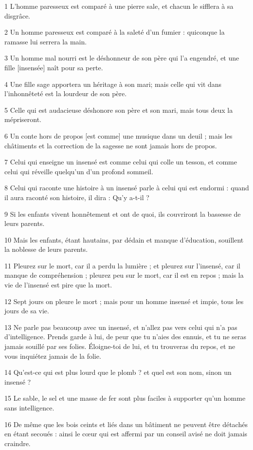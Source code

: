 \par 1 L'homme paresseux est comparé à une pierre sale, et chacun le sifflera à sa disgrâce.
\par 2 Un homme paresseux est comparé à la saleté d'un fumier : quiconque la ramasse lui serrera la main.
\par 3 Un homme mal nourri est le déshonneur de son père qui l'a engendré, et une fille [insensée] naît pour sa perte.
\par 4 Une fille sage apportera un héritage à son mari; mais celle qui vit dans l'inhonnêteté est la lourdeur de son père.
\par 5 Celle qui est audacieuse déshonore son père et son mari, mais tous deux la mépriseront.
\par 6 Un conte hors de propos [est comme] une musique dans un deuil ; mais les châtiments et la correction de la sagesse ne sont jamais hors de propos.
\par 7 Celui qui enseigne un insensé est comme celui qui colle un tesson, et comme celui qui réveille quelqu'un d'un profond sommeil.
\par 8 Celui qui raconte une histoire à un insensé parle à celui qui est endormi : quand il aura raconté son histoire, il dira : Qu'y a-t-il ?
\par 9 Si les enfants vivent honnêtement et ont de quoi, ils couvriront la bassesse de leurs parents.
\par 10 Mais les enfants, étant hautains, par dédain et manque d'éducation, souillent la noblesse de leurs parents.
\par 11 Pleurez sur le mort, car il a perdu la lumière ; et pleurez sur l'insensé, car il manque de compréhension ; pleurez peu sur le mort, car il est en repos ; mais la vie de l'insensé est pire que la mort.
\par 12 Sept jours on pleure le mort ; mais pour un homme insensé et impie, tous les jours de sa vie.
\par 13 Ne parle pas beaucoup avec un insensé, et n'allez pas vers celui qui n'a pas d'intelligence. Prends garde à lui, de peur que tu n'aies des ennuis, et tu ne seras jamais souillé par ses folies. Éloigne-toi de lui, et tu trouveras du repos, et ne vous inquiétez jamais de la folie.
\par 14 Qu'est-ce qui est plus lourd que le plomb ? et quel est son nom, sinon un insensé ?
\par 15 Le sable, le sel et une masse de fer sont plus faciles à supporter qu'un homme sans intelligence.
\par 16 De même que les bois ceints et liés dans un bâtiment ne peuvent être détachés en étant secoués : ainsi le cœur qui est affermi par un conseil avisé ne doit jamais craindre.

